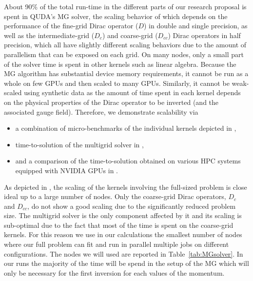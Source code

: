 About 90\% of the total run-time in the different parts of our research proposal is spent in QUDA's MG solver, the scaling behavior of which depends on the performance of the fine-grid Dirac operator ($D$) in double and single precision, as well as the intermediate-grid ($D_c$) and coarse-grid ($D_{cc}$) Dirac operators in half precision, which all have slightly different scaling behaviors due to the amount of parallelism that can be exposed on each grid.
On many nodes, only a small part of the solver time is spent in other kernels such as linear algebra.
Because the MG algorithm has substantial device memory requirements, it cannot be run as a whole on few GPUs and then scaled to many GPUs.
Similarly, it cannot be weak-scaled using synthetic data as the amount of time spent in each kernel depends on the physical properties of the Dirac operator to be inverted (and the associated gauge field).
Therefore, we demonstrate scalability via
\begin{itemize}
	\item  a combination of micro-benchmarks of the individual kernels depicted in ,
	\item time-to-solution of the multigrid solver in ,
	\item and a comparison of the time-to-solution obtained on various HPC systems equipped with NVIDIA GPUs  in .
\end{itemize}
As depicted in , the scaling of the kernels involving the full-sized problem is close ideal up to a large number of nodes.
Only the coarse-grid Dirac operators, $D_c$ and $D_{cc}$, do not show a good scaling due to the significantly reduced problem size.
The multigrid solver is the only component affected by it and its scaling is sub-optimal due to the fact that most of the time is spent on the coarse-grid kernels. For this reason we use in our calculations the smallest number of nodes where our full problem can fit and run in parallel multiple jobs on different configurations. 
The nodes we will used are reported in Table~\ref{tab:MGsolver}.
In our runs the majority of the time will be spend in the setup of the MG
which will only be necessary for the first inversion for each values of the momentum.

